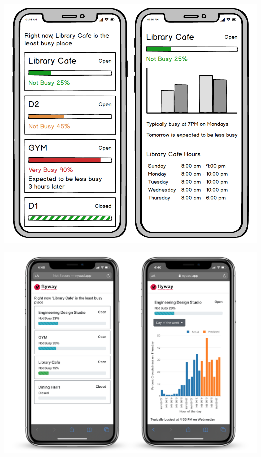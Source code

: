 \documentclass[journal, 12pt]{IEEEtran}
\begin{document}
\begingroup
    \center
    \medskip
    \includegraphics[width=0.9\columnwidth]{report/interim_report/images/ux.png}
    \label{fig:ui_proposed}
    \medskip
\endgroup

\begingroup
    \center
    \medskip
    \includegraphics[width=\columnwidth]{report/final_report/images/ui_real_combined.png}
    \label{fig:ui_implemented}
    \medskip
\endgroup
\end{document}
